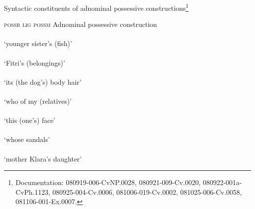 \begin{styleExampleTitle}
Syntactic constituents of adnominal possessive constructions\footnote{Documentation: 080919-006-CvNP.0028, 080921-009-Cv.0020, 080922-001a-CvPh.1123, 080925-004-Cv.0006, 081006-019-Cv.0002, 081025-006-Cv.0058, 081106-001-Ex.0007.}
\end{styleExampleTitle}
\ea
\label{Example_8.96}
\hspace{15pt} \textsc{possr}  \textsc{lig}  \textsc{possm}\hspace{15pt}  Adnominal possessive construction\\
 \ea
\label{Example_8.96a}
  {}  {}  {\hspace{15.1mm}}  {}\\ %
 {} {} {} {}  {‘younger sister’s (fish)’}\\
\ex
\label{Example_8.96b}
\gll {}       {\hspace{15.1mm}} {}\\
 {} {} {} {}  {‘Fitri’s (belongings)’}\\
\ex
\label{Example_8.96c}
\gll {}       {\hspace{10mm}} {}\\
  {} {} {} {} {‘its (the dog’s) body hair’}\\
\ex
\label{Example_8.96d}
\gll {}      {\hspace{13.3mm}}  {}\\
{} {} {} {}    {‘who of my (relatives)’ }\\
\ex
\label{Example_8.96e}
\gll {}       {\hspace{15mm}}  {}\\
 {} {} {} {}  {‘this (one’s) face’ }\\
\ex
\label{Example_8.96f}
\gll  {}      {\hspace{16.5mm}}  {}\\
{} {} {} {}   {‘whose sandals’}\\
\ex
\label{Example_8.96g}
\gll {}       {\hspace{16mm}}  {} \\
 {} {} {} {} {‘mother Klara’s daughter’}\\
\z
\z


